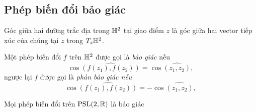 \subsection{Phép biến đổi bảo giác}
\begin{defn} 
    Góc giữa hai đường trắc địa trong $\mathbb{H}^2$ tại giao điểm $z$ là góc giữa hai vector tiếp xúc của chúng tại $z$ trong $T_z\mathbb{H}^2$.
\end{defn}
\begin{defn}
    Một phép biến đổi $f$ trên $\mathbb{H}^2$ được gọi là \textit{bảo giác} nếu 
    \[\cos\widehat{(f(z_1),f(z_2))} = \cos\widehat{(z_1,z_2)},\]
    ngược lại $f$ được gọi là \textit{phản bảo giác nếu}
    \[\cos\widehat{(f(z_1),f(z_2))} = -\cos\widehat{(z_1,z_2)},\]
\end{defn}
\begin{thm}\label{thm 2.3.10}
    Mọi phép biến đổi trên $\operatorname{PSL}(2,\mathbb{R})$ là bảo giác 
\end{thm}
